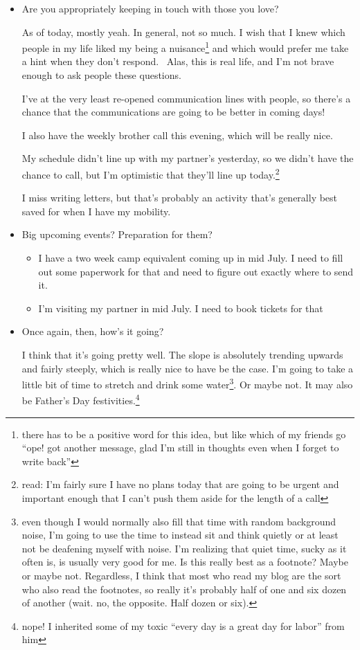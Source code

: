 \documentclass[12pt]{article}
\newcommand{\say}[1]{``#1''}
\renewcommand{\,}{\textsuperscript{,}}
\begin{document}
\begin{itemize}
\item Are you appropriately keeping in touch with those you love?

As of today, mostly yeah.  
In general, not so much.  
I wish that I knew which people in my life liked my being a nuisance\footnote{there has to be a positive word for this idea, but like which of my friends go \say{ope! got another message, glad I'm still in thoughts even when I forget to write back}} and which would prefer me take a hint when they don't respond.   
Alas, this is real life, and I'm not brave enough to ask people these questions.

I've at the very least re-opened communication lines with people, so there's a chance that the communications are going to be better in coming days!

I also have the weekly brother call this evening, which will be really nice.

My schedule didn't line up with my partner's yesterday, so we didn't have the chance to call, but I'm optimistic that they'll line up today.\footnote{read: I'm fairly sure I have no plans today that are going to be urgent and important enough that I can't push them aside for the length of a call}

I miss writing letters, but that's probably an activity that's generally best saved for when I have my mobility.

\item Big upcoming events? Preparation for them?

\begin{itemize}

\item I have a two week camp equivalent coming up in mid July. I need to fill out some paperwork for that and need to figure out exactly where to send it.  
\item I'm visiting my partner in mid July. I need to book tickets for that

\end{itemize}

\item Once again, then, how's it going?

I think that it's going pretty well.  
The slope is absolutely trending upwards and fairly steeply, which is really nice to have be the case.  
I'm going to take a little bit of time to stretch and drink some water\footnote{even though I would normally also fill that time with random background noise, I'm going to use the time to instead sit and think quietly or at least not be deafening myself with noise. I'm realizing that quiet time, sucky as it often is, is usually very good for me. Is this really best as a footnote? Maybe or maybe not. Regardless, I think that most who read my blog are the sort who also read the footnotes, so really it's probably half of one and six dozen of another (wait. no, the opposite. Half dozen or six).}.  
Or maybe not. It may also be Father's Day festivities.\footnote{nope! I inherited some of my toxic \say{every day is a great day for labor} from him}

\end{itemize}
\end{document}
